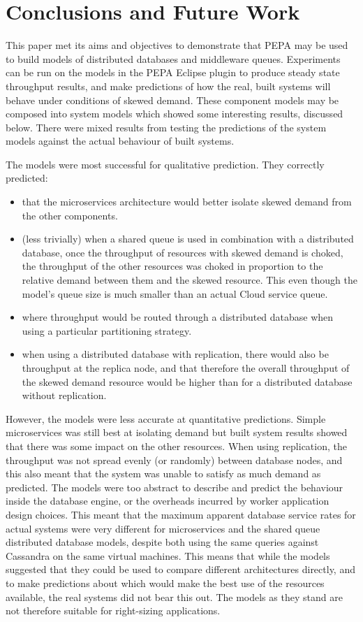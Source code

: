 \documentclass[runningheads]{llncs}
\begin{document}
\section{Conclusions and Future Work}\label{sec:conclusions}

This paper met its aims and objectives to demonstrate that PEPA may be used to build models of distributed databases and middleware queues.  Experiments can be run on the models in the PEPA Eclipse plugin to produce steady state throughput results, and make predictions of how the real, built systems will behave under conditions of skewed demand.  These component models may be composed into system models which showed some interesting results, discussed below.  There were mixed results from testing the predictions of the system models against the actual behaviour of built systems.

The models were most successful for qualitative prediction.  They correctly predicted:
\begin{itemize}
	\item that the microservices architecture would better isolate skewed demand from the other components.
	\item (less trivially) when a shared queue is used in combination with a distributed database, once the throughput of resources with skewed demand is choked, the throughput of the other resources was choked in proportion to the relative demand between them and the skewed resource.  This even though the model's queue size is much smaller than an actual Cloud service queue.
	\item where throughput would be routed through a distributed database when using a particular partitioning strategy.
	\item when using a distributed database with replication, there would also be throughput at the replica node, and that therefore the overall throughput of the skewed demand resource would be higher than for a distributed database without replication.
\end{itemize}

However, the models were less accurate at quantitative predictions.  Simple microservices was still best at isolating demand but built system results showed that there was some impact on the other resources.  When using replication, the throughput was not spread evenly (or randomly) between database nodes, and this also meant that the system was unable to satisfy as much demand as predicted.  The models were too abstract to describe and predict the behaviour inside the database engine, or the overheads incurred by worker application design choices.  This meant that the maximum apparent database service rates for actual systems were very different for microservices and the shared queue distributed database models, despite both using the same queries against Cassandra on the same virtual machines.  This means that while the models suggested that they could be used to compare different architectures directly, and to make predictions about which would make the best use of the resources available, the real systems did not bear this out.  The models as they stand are not therefore suitable for right-sizing applications.
\end{document}
